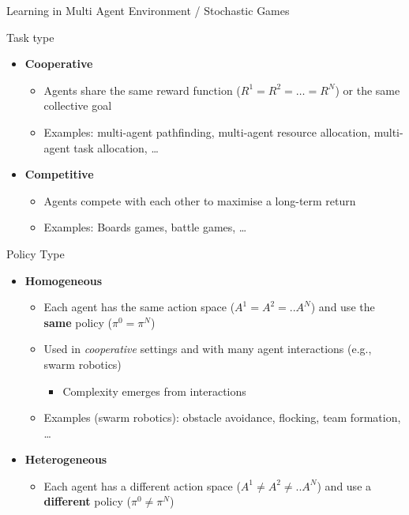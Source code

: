 \documentclass[presentation, 9pt]{beamer}\mode<presentation>{\usetheme{AMSBolognaFC}}
\begin{document}
\begin{frame}[allowframebreaks]{Learning in Multi Agent Environment / Stochastic Games}
\begin{exampleblock}{Task type}
	\begin{itemize}
		\item \textbf{Cooperative}
		\begin{itemize}
			\item Agents share the same reward function ($R^1 = R^2 = \dots = R^N$) or the same collective goal
			\item Examples: multi-agent pathfinding, multi-agent resource allocation, multi-agent task allocation, \dots
		\end{itemize}
		\item \textbf{Competitive}
		\begin{itemize}
			\item Agents compete with each other to maximise a long-term return
			\item Examples: Boards games, battle games, \dots
		\end{itemize}
	\end{itemize}
\end{exampleblock}
\begin{exampleblock}{Policy Type}
\begin{itemize}
	\item \textbf{Homogeneous}
	\begin{itemize}
		\item Each agent has the same action space ($ A^1 = A^2 = .. A ^N$) and use the \textbf{same} policy ($ \pi^0 = \pi^N$)
		\item Used in \emph{cooperative} settings and with many agent interactions (e.g., swarm robotics)
		\begin{itemize}
			\item Complexity emerges from interactions
		\end{itemize}
		\item Examples (swarm robotics): obstacle avoidance, flocking, team formation, \dots
	\end{itemize}
	\item \textbf{Heterogeneous}
	\begin{itemize}
		\item Each agent has a different action space ($ A^1 \neq A^2 \neq .. A ^N$) and use a \textbf{different} policy ($ \pi^0 \neq \pi^N$)
	\end{itemize}
\end{itemize}
\end{exampleblock}

\end{frame}
\end{document}
